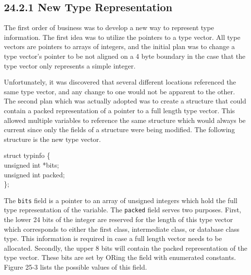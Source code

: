 \subsection[24.2.1 New Type Representation]{24.2.1 New Type Representation}

The first order of business was to develop a new way to represent type
information. The first idea was to utilize the pointers to a type
vector. All type vectors are pointers to arrays of integers, and the
initial plan was to change a type vector's pointer to be not aligned
on a 4 byte boundary in the case that the type vector only represents
a simple integer.

Unfortunately, it was discovered that several different locations
referenced the same type vector, and any change to one would not be
apparent to the other. The second plan which was actually adopted was
to create a structure that could contain a packed representation of a
pointer to a full length type vector. This allowed multiple variables
to reference the same structure which would always be current since
only the fields of a structure were being modified.  The following
structure is the new type vector.

\goodbreak
\begin{iconcode}
struct typinfo \{\\
\>unsigned int *bits;\\
\>unsigned int packed;\\
\};\\
\end{iconcode}


The \texttt{bits} field is a pointer to an array of unsigned integers
which hold the full type representation of the variable. The
\texttt{packed} field serves two purposes. First, the lower 24 bits of
the integer are reserved for the length of this type vector which
corresponds to either the first class, intermediate class, or database
class type. This information is required in case a full length vector
needs to be allocated. Secondly, the upper 8 bits will contain the
packed representation of the type vector. These bits are set by ORing
the field with enumerated constants. Figure 25-3 lists the possible
values of this field.

